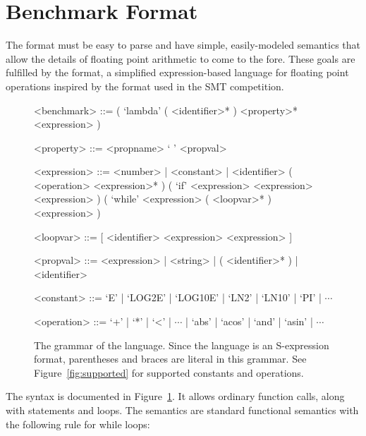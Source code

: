 \documentclass[main.tex]{subfiles}
\begin{document}
\section{Benchmark Format}
\label{sec:format}

The \name format must be easy to parse and have simple, easily-modeled
semantics that allow the details of floating point arithmetic to come
to the fore. These goals are fulfilled by the \core format, a
simplified expression-based language for floating point operations
inspired by the \smtlib format used in the SMT competition.

\begin{figure}
\begin{grammar}
<benchmark> ::= ( `lambda' ( <identifier>* ) <property>* <expression> )

<property> ::= <propname> ` ' <propval>

<expression> ::= <number> | <constant> | <identifier>
\alt ( <operation> <expression>* )
\alt ( `if' <expression> <expression> <expression> )
\alt ( `while' <expression> ( <loopvar>* ) <expression> )

<loopvar> ::= [ <identifier> <expression> <expression> ]

<propval> ::= <expression> | <string> | ( <identifier>* ) | <identifier>

<constant> ::= `E' | `LOG2E' | `LOG10E' | `LN2' | `LN10' | `PI' | $\dotsb$

<operation> ::= `+' | `*' | `<' | $\dotsb$ | `abs' | `acos' | `and' | `asin' | $\dotsb$

\end{grammar}
\caption{The grammar of the \core language. Since the language is an
  S-expression format, parentheses and braces are literal in this
  grammar. See Figure~\ref{fig:supported} for supported constants and
  operations.}
\label{fig:core}
\end{figure}

The \core syntax is documented in Figure~\ref{fig:core}. It allows
ordinary function calls, along with  statements and 
loops. The semantics are standard functional semantics with the
following rule for while loops:

\begin{mathpar}

\end{mathpar}
\end{document}
